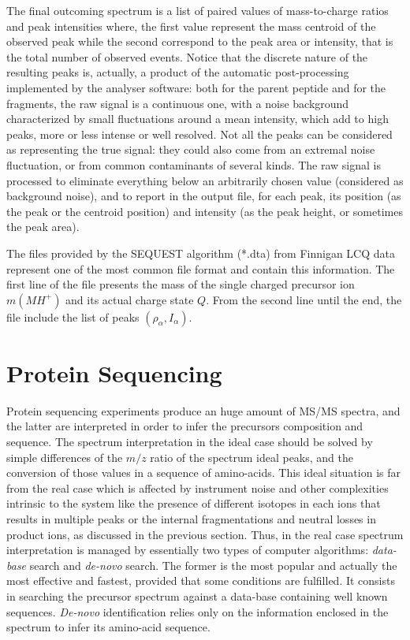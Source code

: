 The final outcoming spectrum is a list of paired values of mass-to-charge
ratios and peak intensities where, the first value represent the mass centroid of the observed peak
while the second correspond to the peak area or intensity, that is the total
number of observed events.
Notice that the discrete nature of the resulting peaks
is, actually, a product of the automatic post-processing implemented by the
analyser software: both for the parent peptide and for the fragments, the raw
signal is a continuous one, with  a noise background characterized by small
fluctuations around a mean intensity, which add to high peaks, more or less
intense or well resolved. Not all the peaks can be considered as representing
the true signal: they could also come from an extremal noise fluctuation, or
from common contaminants of several kinds. 
The raw signal is processed to
eliminate everything  below an arbitrarily chosen value (considered as
background noise), and to report in the output file, for each peak, its position
(as the peak or the centroid position) and intensity (as the peak height, or
sometimes the peak area).




The files provided by the SEQUEST algorithm (*.dta) from Finnigan LCQ data
represent one of the most common file format and contain this information.
The first line of the file presents the mass of the single charged precursor ion
$m(MH^+)$ and its actual charge state $Q$.
From the second line until the end, the file include the list of peaks
$(\rho_\alpha,I_\alpha)$. 



\section{Protein Sequencing}

Protein sequencing experiments produce an huge amount of MS/MS spectra,
and the latter are interpreted in order to infer the precursors composition and
sequence.
The spectrum interpretation in the ideal case should be solved by simple
differences of the $m/z$ ratio of the spectrum ideal peaks, and the conversion
of those values in a sequence of amino-acids.
This ideal situation is far from the real case which is affected by instrument
noise and other complexities intrinsic to the system like the presence of
different isotopes in each ions that results
in multiple peaks or the internal fragmentations and neutral losses in product ions,
as discussed in the previous section.
Thus, in the real case spectrum interpretation 
is managed by essentially two types of computer algorithms:
\emph{data-base} search and \emph{de-novo} search.
The former is the most popular and actually the most effective and fastest,
provided that some conditions are fulfilled. It
consists in searching the precursor spectrum against a data-base containing well known
sequences.
\emph{De-novo} identification relies only on the information enclosed in the spectrum to
infer its amino-acid sequence.


